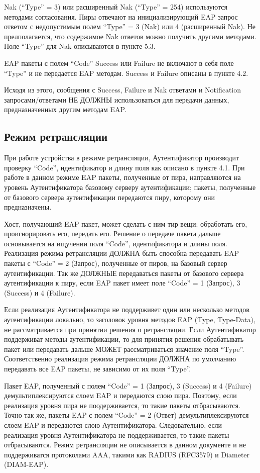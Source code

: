 Nak (``Type'' = 3) или расширенный Nak (``Type'' = 254) используются методами согласования. Пиры отвечают на инициализирующий EAP запрос ответом с недопустимым полем ``Type'' = 3 (Nak) или 4 (расширенный Nak). Не прелполагается, что содержимое Nak ответов можно получить другими методами. Поле ``Type'' для Nak описываются в пункте 5.3.

EAP пакеты с полем ``Code'' Success или Failure не включают в себя поле ``Type'' и не передается EAP методам. Success и Failure описаны в пункте 4.2.

Исходя из этого, сообщения с Success, Failure и Nak ответами и Notification запросами/ответами НЕ ДОЛЖНЫ использоваться для передачи данных, предназначенных другим методам EAP.

\subsection{Режим ретрансляции}

При работе устройства в режиме ретрансляции, Аутентификатор производит проверку ``Code'', идентификатор и длину поля как описано в пункте 4.1. При работе в данном режиме EAP пакеты, полученные от пира, направляются на уровень Аутентификатора базовому серверу аутентификации; пакеты, полученные от базового сервера аутентификации передаются пиру, которому они предназначены.

Хост, получающий EAP пакет, может сделать с ним тир вещи: обработать его, проигнорировать его, передать его. Решение о передаче пакета дальше основывается на ищучении поля ``Code'', идентификатора и длины поля. Реализация режима ретрансляции ДОЛЖНА быть способна передавать EAP пакеты с ``Code'' = 2 (Запрос), полученные от пиров, на базовый сервер аутентификации. Так же ДОЛЖНЫЕ передаваться пакеты от базового сервера аутентификации к пиру, если EAP пакет имеет поле ``Code'' = 1 (Запрос), 3 (Success) и 4 (Failure).

Если реализация Аутентификатора не поддерживет один или несколько методов аутентификации локально, то заголовок уровня методов EAP (Type, Type-Data), не рассматривается при принятии решения о ретрансляции. Если Аутентификатор поддерживат методы аутентификации, то для принятия решения обрабатывать пакет или передавать дальше МОЖЕТ рассматриваться значение поля ``Type''. Соответственно реализация режима ретрансляции ДОЛЖНА по умолчанию передавать все EAP пакеты, не зависимо от их поля ``Type''.

Пакет EAP, полученный с полем ``Code'' = 1 (Запрос), 3 (Success) и 4 (Failure) демультиплексируются слоем EAP и передаются слою пира. Поэтому, если реализация уровня пира не поодерживается, то такие пакеты отбрасываются. Точно так же, пакеты EAP с полем ``Code'' = 2 (Ответ) демультиплексируются слоем EAP и передаются слою Аутентификатора. Следовательно, если реализация уровня Аутентификатора не поддерживается, то такие пакеты отбрасываются. Режим ретрансляции не описывается в данном документе и не поддерживатся протоколами AAA, такими как RADIUS (RFC3579) и Diameter (DIAM-EAP).

